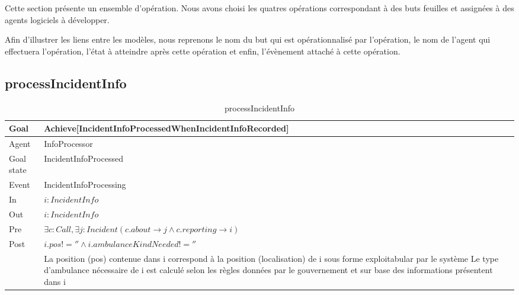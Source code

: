 Cette section présente un ensemble d'opération. Nous avons choisi les quatres
opérations correspondant à des buts feuilles et assignées à des agents logiciels
à développer.

Afin d'illustrer les liens entre les modèles, nous reprenons le nom du but
qui est opérationnalisé par l'opération, le nom de l'agent qui effectuera 
l'opération, l'état à atteindre après cette opération et enfin, l'évènement
attaché à cette opération.

\subsection{processIncidentInfo}
	\begin{table}[!h] \centering
		\begin{tabularx}{\textwidth}{|l|X|} \hline
			Goal & Achieve[IncidentInfoProcessedWhenIncidentInfoRecorded] \\ \hline
			Agent & InfoProcessor \\ \hline
			Goal state & IncidentInfoProcessed \\ \hline
			Event & IncidentInfoProcessing \\ \hline
			In & $i: IncidentInfo$ \\ \hline
			Out & $i: IncidentInfo$ \\ \hline
			Pre & $\exists c: Call, \exists j: Incident (c.about \rightarrow j \wedge c.reporting \rightarrow i)$ \\ \hline
			Post & $i.pos != '' \wedge i.ambulanceKindNeeded != ''$  \\
				 & La position (pos) contenue dans i correspond à la position (localisation) de i sous forme exploitabular par le système 
				  Le type d'ambulance nécessaire de i est calculé selon les règles données par le gouvernement et sur base des 
				  informations présentent dans i \\ \hline
		\end{tabularx}
		\caption{processIncidentInfo}
	\end{table}

